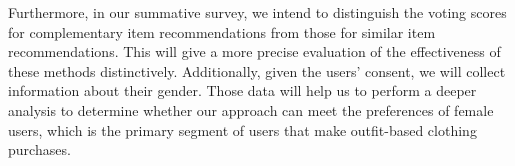 Furthermore, in our summative survey, we intend to distinguish the voting scores for complementary item recommendations from those for similar item recommendations. This will give a more precise evaluation of the effectiveness of these methods distinctively. Additionally, given the users' consent, we will collect information about their gender. Those data will help us to perform a deeper analysis to determine whether our approach can meet the preferences of female users, which is the primary segment of users that make outfit-based clothing purchases.
